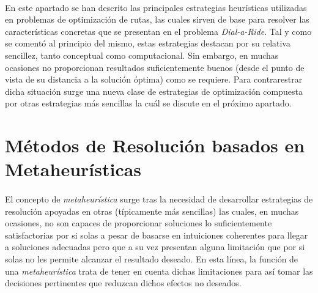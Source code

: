 \documentclass{subfiles}
\begin{document}
      \paragraph{}
      En este apartado se han descrito las principales estrategias heurísticas utilizadas en problemas de optimización de rutas, las cuales sirven de base para resolver las características concretas que se presentan en el problema \emph{Dial-a-Ride}. Tal y como se comentó al principio del mismo, estas estrategias destacan por su relativa sencillez, tanto conceptual como computacional. Sin embargo, en muchas ocasiones no proporcionan resultados suficientemente buenos (desde el punto de vista de su distancia a la solución óptima) como se requiere. Para contrarestrar dicha situación surge una nueva clase de estrategias de optimización compuesta por otras estrategias más sencillas la cuál se discute en el próximo apartado.

    \section{Métodos de Resolución basados en Metaheurísticas}
    \label{sec:solving_metaheuristics}

      \paragraph{}
      El concepto de \emph{metaheurística} surge tras la necesidad de desarrollar estrategias de resolución apoyadas en otras (típicamente más sencillas) las cuales, en muchas ocasiones, no son capaces de proporcionar soluciones lo suficientemente satisfactorias por si solas a pesar de basarse en intuiciones coherentes para llegar a soluciones adecuadas pero que a su vez presentan alguna limitación que por si solas no les permite alcanzar el resultado deseado. En esta línea, la función de una \emph{metaheurística} trata de tener en cuenta dichas limitaciones para así tomar las decisiones pertinentes que reduzcan dichos efectos no deseados.
\end{document}
